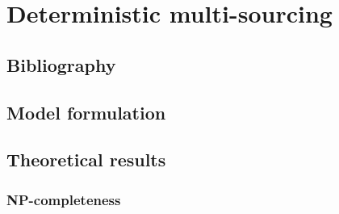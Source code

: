 \chapter{Deterministic multi-sourcing}

\section{Bibliography}


\section{Model formulation}


\section{Theoretical results}

\subsection{NP-completeness}


